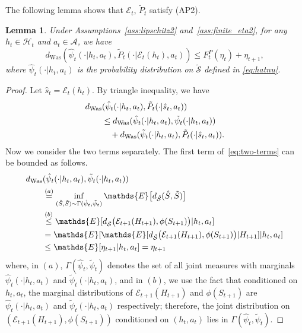 \documentclass[letterpaper, 10pt]{IEEEtran}
\theoremstyle{plain}
\newtheorem{lemma}{Lemma}
\theoremstyle{nonumberplain}
\newtheorem{proof}{Proof}
\theoremstyle{plain}
\newcommand*\ALPHABET{\mathcal}
\newcommand*\ABSTRACT{\tilde}
\newcommand*\ESTIMATE{\hat}
\newcommand*\EXP{\mathds{E}}
\newcommand\dWas{d_{\mathrm{Was}}}
\newcommand\dhS{d_{\ABSTRACT {\ALPHABET S}}}
\newcommand\EST{\mathcal{E}}
\begin{document}
The following lemma shows that $\EST_t$, $\ABSTRACT{P}_t$ satisfy (AP2).
\begin{lemma}\label{lem:P2}
  Under Assumptions~\ref{ass:lipschitz2} and~\ref{ass:finite_eta2}, for any  $h_t \in \ALPHABET H_t$ and $a_t \in \ALPHABET A$, we have
   \begin{equation*}
       \dWas(\hat\psi_{t}(\cdot | h_t, a_t), 
       \ABSTRACT P_{t}(\cdot | \EST_t(h_t), a_t) ) 
       \le F^P_t (\eta_t)+ \eta_{t+1},
   \end{equation*}
   where $\hat\psi_{t}(\cdot | h_t,a_t)$ is the probability distribution on $\ABSTRACT{\ALPHABET S}$ defined in \eqref{eq:hatnu}.
\end{lemma}
\begin{proof}
   Let $\ESTIMATE s_t = \EST_t(h_t)$. By triangle inequality, we have
   \begin{align}
       \hskip 2em & \hskip -2em
       \dWas(\ESTIMATE\psi_{t}(\cdot | h_t, a_t), 
       \ABSTRACT P_{t}(\cdot | \ESTIMATE s_t, a_t) ) \notag \\
      &\le 
       \dWas(\ESTIMATE\psi_{t}(\cdot | h_t, a_t), 
       \ABSTRACT\psi_{t}(\cdot | h_t, a_t))
       \notag \\
       &\quad + 
       \dWas(\ABSTRACT\psi_{t}(\cdot | h_t, a_t),
       \ABSTRACT P_{t}(\cdot | \ESTIMATE s_t, a_t) ). 
       \label{eq:two-terms}
   \end{align}
   Now we consider the two terms separately. The first term of~\eqref{eq:two-terms} can be bounded as follows.
   \begin{align}
       \hskip 2em & \hskip -2em
        \dWas(\ESTIMATE \psi_{t}(\cdot | h_t, a_t), 
       \ABSTRACT \psi_{t}(\cdot | h_t, a_t))
       \notag \\
       &\stackrel{(a)}= \inf_{ (\ESTIMATE{S}, \ABSTRACT S) \sim \Gamma(\ESTIMATE \psi_{t}, \ABSTRACT \psi_{t})}
       \EXP \bigl[
       \dhS(\ESTIMATE{S}, \ABSTRACT S) \bigr]
       \notag \\
       &\stackrel{(b)}\le \EXP[ \dhS\bigl(\EST_{t+1}(H_{t+1}), \phi(S_{t+1})\bigr) | h_t, a_t ] 
       \notag \\
       &= \EXP[ \EXP[ \dhS\bigl(\EST_{t+1}(H_{t+1}), \phi(S_{t+1})\bigr) | H_{t+1} ]  | h_t, a_t ] 
       \notag \\
       &\le \EXP[ \eta_{t+1}  | h_t, a_t ] 
       = \eta_{t+1}
       \label{eq:1st-term}
   \end{align}
   where, in $(a)$,  $\Gamma(\ESTIMATE \psi_{t}, \ABSTRACT \psi_{t})$ denotes the set of all joint measures with marginals $\ESTIMATE\psi_{t}(\cdot | h_t, a_t)$ and $\ABSTRACT \psi_{t}(\cdot | h_t, a_t)$, and in $(b)$, we use the fact that conditioned on $h_t,a_t$, the marginal distributions of $\EST_{t+1}(H_{t+1})$ and $\phi(S_{t+1})$ are   $\ESTIMATE \psi_{t}(\cdot | h_t, a_t)$ and $\ABSTRACT \psi_{t}(\cdot | h_t, a_t)$ respectively; therefore, the joint distribution on $(\EST_{t+1}(H_{t+1}), \phi(S_{t+1}))$ conditioned on $(h_t, a_t)$ lies in $\Gamma(\ESTIMATE \psi_{t}, \ABSTRACT \psi_{t})$.  


\end{proof}
\end{document}
